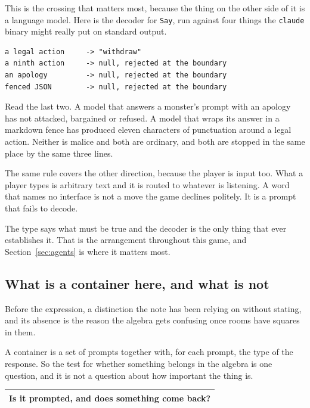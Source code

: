 \documentclass[11pt,a4paper]{article}
\begin{document}
This is the crossing that matters most, because the thing on the other side of it is a language
model. Here is the decoder for \texttt{Say}, run against four things the \texttt{claude} binary
might really put on standard output.

\noindent\begin{minipage}{\linewidth}
\begin{lstlisting}[breaklines=false, basicstyle=\ttfamily\footnotesize]
a legal action     -> "withdraw"
a ninth action     -> null, rejected at the boundary
an apology         -> null, rejected at the boundary
fenced JSON        -> null, rejected at the boundary
\end{lstlisting}
\end{minipage}

Read the last two. A model that answers a monster's prompt with an apology has not attacked,
bargained or refused. A model that wraps its answer in a markdown fence has produced eleven
characters of punctuation around a legal action. Neither is malice and both are ordinary, and both
are stopped in the same place by the same three lines.

\begin{sectionbox}
The same rule covers the other direction, because the player is input too. What a player types is
arbitrary text and it is routed to whatever is listening. A word that names no interface is not a
move the game declines politely. It is a prompt that fails to decode.
\end{sectionbox}

The type says what must be true and the decoder is the only thing that ever establishes it. That is
the arrangement throughout this game, and Section~\ref{sec:agents} is where it matters most.

\subsection{What is a container here, and what is not}
\label{sec:roles}

Before the expression, a distinction the note has been relying on without stating, and its absence
is the reason the algebra gets confusing once rooms have squares in them.

A container is a set of prompts together with, for each prompt, the type of the response. So the
test for whether something belongs in the algebra is one question, and it is not a question about
how important the thing is.

\begin{center}
\begin{tabular}{@{}>{\raggedright\arraybackslash}p{}@{}}
\toprule
\textbf{Is it prompted, and does something come back?} \\
\bottomrule
\end{tabular}
\end{center}
\end{document}
